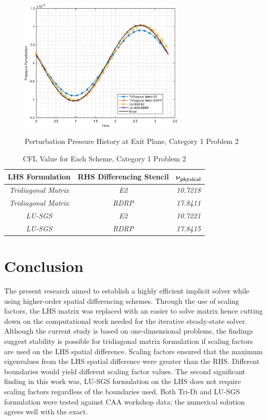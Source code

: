 \documentclass[conf]{new-aiaa}
\begin{document}
\begin{figure}[hbtp!]
	\centering
	{\includegraphics[width=0.7\textwidth]{Figures/Exit_vs_Time}}
	\caption{Perturbation Pressure History at Exit Plane, Category 1 Problem 2}
	\label{fig:Exit_C1P2}
\end{figure}


\begin{table}[htp!]
\centering
\caption{CFL Value for Each Scheme, Category 1 Problem 2}
\label{tab:C1P2}
\begin{tabular}{|c|c|c|}
\hline
\textbf{LHS Formulation} & \textbf{RHS Differencing Stencil} & \textbf{$\boldsymbol{\nu_{physical}}$} \\ \hline
\textit{Tridiagonal Matrix} & \textit{E2}   & \textit{10.7218} \\ \hline
\textit{Tridiagonal Matrix} & \textit{RDRP} & \textit{17.8411} \\ \hline
\textit{LU-SGS}             & \textit{E2}   & \textit{10.7221} \\ \hline
\textit{LU-SGS}             & \textit{RDRP} & \textit{17.8415} \\ \hline
\end{tabular}
\end{table}

\section{Conclusion}
The present research aimed to establish a highly efficient implicit solver while using higher-order spatial differencing schemes. 
Through the use of scaling factors, the LHS matrix was replaced with an easier to solve matrix hence cutting down on the computational work needed for the iterative steady-state solver. 
Although the current study is based on one-dimensional problems, the findings suggest stability is possible for tridiagonal matrix formulation if scaling factors are used on the LHS spatial difference. 
Scaling factors ensured that the maximum eigenvalues from the LHS spatial difference were greater than the RHS.  
Different boundaries would yield different scaling factor values. 
The second significant finding in this work was, LU-SGS formulation on the LHS does not require scaling factors regardless of the boundaries used. 
Both Tri-Di and LU-SGS formulation were tested against CAA workshop data; the numerical solution agrees well with the exact.  
\end{document}
